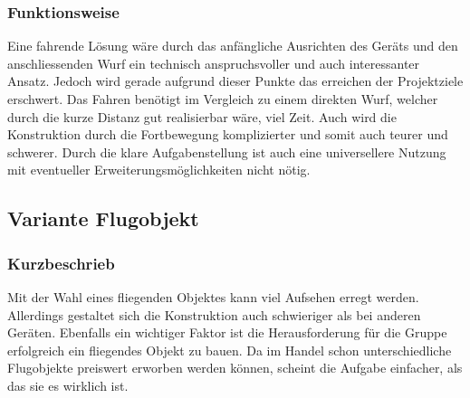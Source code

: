 \subsubsection{Funktionsweise}
Eine fahrende Lösung wäre durch das anfängliche Ausrichten des Geräts und 
den anschliessenden Wurf ein technisch anspruchsvoller und auch interessanter 
Ansatz. Jedoch wird gerade aufgrund dieser Punkte das erreichen der 
Projektziele erschwert. Das Fahren benötigt im Vergleich zu einem direkten 
Wurf, welcher durch die kurze Distanz gut realisierbar wäre, viel Zeit. Auch 
wird die Konstruktion durch die Fortbewegung komplizierter und somit auch 
teurer und schwerer. Durch die klare Aufgabenstellung ist auch eine 
universellere Nutzung mit eventueller Erweiterungsmöglichkeiten nicht nötig. 



\clearpage

\subsection{Variante Flugobjekt}
\subsubsection{Kurzbeschrieb}
Mit der Wahl eines fliegenden Objektes kann viel Aufsehen erregt werden. 
Allerdings gestaltet sich die Konstruktion auch schwieriger als bei anderen 
Geräten. Ebenfalls ein wichtiger Faktor ist die Herausforderung für die Gruppe 
erfolgreich ein fliegendes Objekt zu bauen. Da im Handel schon 
unterschiedliche Flugobjekte preiswert erworben werden können, scheint die 
Aufgabe einfacher, als das sie es wirklich ist.

